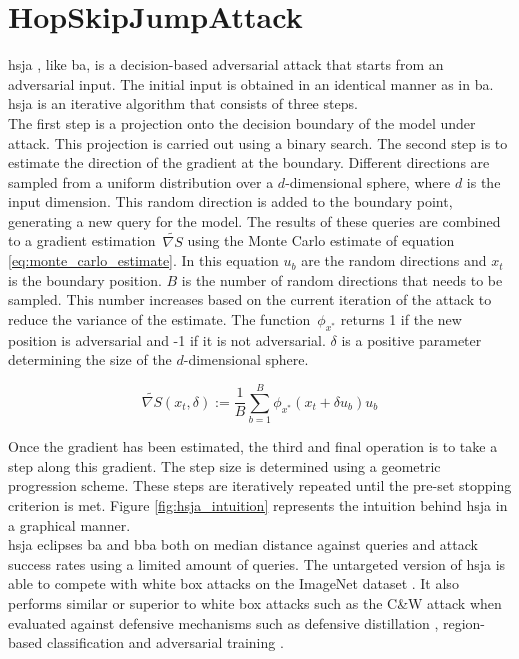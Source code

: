 \section{HopSkipJumpAttack}
\gls{hsja} \cite{hsja}, like \gls{ba}, is a decision-based adversarial attack that starts from an adversarial input. The initial input is obtained in an identical manner as in \gls{ba}. \gls{hsja} is an iterative algorithm that consists of three steps.\\

The first step is a projection onto the decision boundary of the model under attack. This projection is carried out using a binary search. The second step is to estimate the direction of the gradient at the boundary. Different directions are sampled from a uniform distribution over a $d$-dimensional sphere, where $d$ is the input dimension. This random direction is added to the boundary point, generating a new query for the model. The results of these queries are combined to a gradient estimation~$\widetilde{\nabla S}$ using the Monte Carlo estimate of equation \ref{eq:monte_carlo_estimate}. In this equation $u_b$ are the random directions and $x_t$ is the boundary position. $B$ is the number of random directions that needs to be sampled. This number increases based on the current iteration of the attack to reduce the variance of the estimate. The function~$\phi_{x^*}$ returns 1 if the new position is adversarial and -1 if it is not adversarial. $\delta$ is a positive parameter determining the size of the $d$-dimensional sphere.

\begin{equation}\label{eq:monte_carlo_estimate}
\widetilde{\nabla S}(x_t,\delta) := \frac{1}{B} \sum_{b=1}^{B}\phi_{x^*}(x_t + \delta u_b)u_b
\end{equation}

Once the gradient has been estimated, the third and final operation is to take a step along this gradient. The step size is determined using a geometric progression scheme. These steps are iteratively repeated until the pre-set stopping criterion is met. Figure \ref{fig:hsja_intuition} represents the intuition behind \gls{hsja} in a graphical manner.\\

\gls{hsja} eclipses \gls{ba} and \gls{bba} both on median distance against queries and attack success rates using a limited amount of queries. The untargeted version of \gls{hsja} is able to compete with white box attacks on the ImageNet dataset \cite{imagenet}. It also performs similar or superior to white box attacks such as the C\&W attack \cite{cw_attack} when evaluated against defensive mechanisms such as defensive distillation \cite{defensive_distillation}, region-based classification \cite{region-based_classification} and adversarial training \cite{FGSM}.


